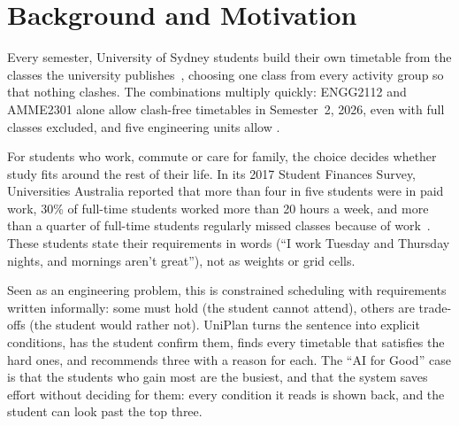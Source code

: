 \section{Background and Motivation}\label{sec:intro}

Every semester, University of Sydney students build their own timetable from the classes the university publishes~\cite{usyd_timetable}, choosing one class from every activity group so that nothing clashes. The combinations multiply quickly: ENGG2112 and AMME2301 alone allow \ttTwo{} clash-free timetables in Semester~2, 2026, even with full classes excluded, and five engineering units allow \ttFive{}.

For students who work, commute or care for family, the choice decides whether study fits around the rest of their life. In its 2017 Student Finances Survey, Universities Australia reported that more than four in five students were in paid work, 30\% of full-time students worked more than 20 hours a week, and more than a quarter of full-time students regularly missed classes because of work~\cite{ua_finances_2017}. These students state their requirements in words (``I work Tuesday and Thursday nights, and mornings aren't great''), not as weights or grid cells.

Seen as an engineering problem, this is constrained scheduling with requirements written informally: some must hold (the student cannot attend), others are trade-offs (the student would rather not). UniPlan turns the sentence into explicit conditions, has the student confirm them, finds every timetable that satisfies the hard ones, and recommends three with a reason for each. The ``AI for Good'' case is that the students who gain most are the busiest, and that the system saves effort without deciding for them: every condition it reads is shown back, and the student can look past the top three.
